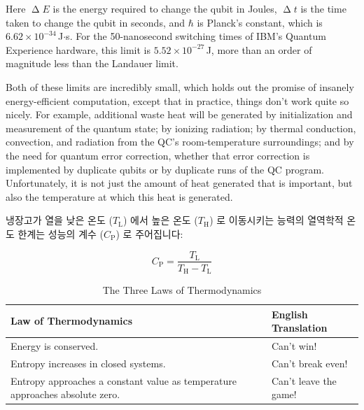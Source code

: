 Here $\upDelta E$ is the energy required to change the qubit in Joules,
$\upDelta t$ is the time taken to change the qubit in seconds, and
$\hbar$ is Planck's constant, which is $6.62 \times 10^{-34}$\,J$\cdot$s.
For the 50-nanosecond switching times of IBM's Quantum Experience
hardware, this limit is $5.52 \times 10^{-27}$\,J, more than an order
of magnitude less than the Landauer limit.

Both of these limits are incredibly small, which holds out the promise
of insanely energy-efficient computation, except that
in practice, things don't work quite so nicely.
For example, additional waste heat will be generated
by initialization and measurement of the quantum state;
by ionizing radiation;
by thermal conduction, convection, and radiation from
the QC's room-temperature surroundings;
and
by the need for quantum error correction, whether that error correction
is implemented by duplicate qubits or by duplicate runs of the QC
program.
Unfortunately, it is not just the amount of heat generated that is
important, but also the temperature at which this heat is generated.
\fi

\newcommand{\TLo}{T_\mathrm{L}}
\newcommand{\THi}{T_\mathrm{H}}
\newcommand{\CPf}{C_\mathrm{P}}

냉장고가 열을 낮은 온도 ($\TLo$) 에서 높은 온도 ($\THi$) 로 이동시키는 능력의
열역학적 온도 한계는 성능의 계수 ($\CPf$) 로 주어집니다:

\begin{equation}
	\CPf = \frac{\TLo}{\THi - \TLo}
\end{equation}

\begin{table}
\renewcommand*{\arraystretch}{1.25}
\centering\footnotesize
\begin{tabular}{p{1.7in}p{0.95in}}
\toprule
Law of Thermodynamics
	& English Translation \\
\midrule
Energy is conserved.
	& Can't win! \\
Entropy increases in closed systems.
	& Can't break even! \\
Entropy approaches a constant value as temperature approaches absolute zero.
	& Can't leave the game! \\
\bottomrule
\end{tabular}
\caption{The Three Laws of Thermodynamics}
\label{tab:future:The Three Laws of Thermodynamics}
\end{table}

